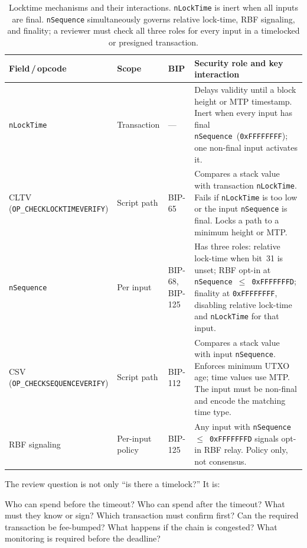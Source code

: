 \begin{table}[htbp]
\centering
\small
\renewcommand{\arraystretch}{1.18}
\begin{tabularx}{\textwidth}{@{}>{\RaggedRight\arraybackslash}p{}>{\RaggedRight\arraybackslash}p{}>{\RaggedRight\arraybackslash}p{}X@{}}
\toprule
Field\,/\,opcode & Scope & BIP & Security role and key interaction \\
\midrule
\texttt{nLockTime} & Transaction & --- & Delays validity until a block height or MTP timestamp. Inert when every input has final \texttt{nSequence}~(\texttt{0xFFFFFFFF}); one non-final input activates it. \\
CLTV (\texttt{OP\_CHECK\-LOCKTIME\-VERIFY}) & Script path & BIP-65 & Compares a stack value with transaction \texttt{nLockTime}. Fails if \texttt{nLockTime} is too low or the input \texttt{nSequence} is final. Locks a path to a minimum height or MTP. \\
\texttt{nSequence} & Per input & BIP-68, BIP-125 & Has three roles: relative lock-time when bit~31 is unset; RBF opt-in at \texttt{nSequence}~$\leq$~\texttt{0xFFFFFFFD}; finality at \texttt{0xFFFFFFFF}, disabling relative lock-time and \texttt{nLockTime} for that input. \\
CSV (\texttt{OP\_CHECK\-SEQUENCE\-VERIFY}) & Script path & BIP-112 & Compares a stack value with input \texttt{nSequence}. Enforces minimum UTXO age; time values use MTP. The input must be non-final and encode the matching time type. \\
RBF signaling & Per-input policy & BIP-125 & Any input with \texttt{nSequence}~$\leq$~\texttt{0xFFFFFFFD} signals opt-in RBF relay. Policy only, not consensus. \\
\bottomrule
\end{tabularx}
\caption{Locktime mechanisms and their interactions. \texttt{nLockTime} is inert when all inputs are final. \texttt{nSequence} simultaneously governs relative lock-time, RBF signaling, and finality; a reviewer must check all three roles for every input in a timelocked or presigned transaction.}
\label{tab:locktime-mechanisms}
\end{table}

The review question is not only ``is there a timelock?'' It is:

\begin{codeblock}
Who can spend before the timeout?
Who can spend after the timeout?
What must they know or sign?
Which transaction must confirm first?
Can the required transaction be fee-bumped?
What happens if the chain is congested?
What monitoring is required before the deadline?
\end{codeblock}


